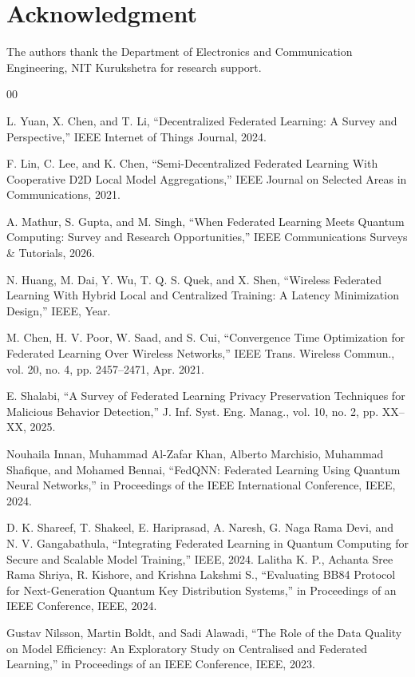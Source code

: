 \documentclass[conference]{IEEEtran}
\begin{document}
\section*{Acknowledgment}

The authors thank the Department of Electronics and Communication Engineering, NIT Kurukshetra for research support.

\begin{thebibliography}{00}

L. Yuan, X. Chen, and T. Li, “Decentralized Federated Learning: A Survey and Perspective,” IEEE Internet of Things Journal, 2024.

F. Lin, C. Lee, and K. Chen, “Semi-Decentralized Federated Learning With Cooperative D2D Local Model Aggregations,” IEEE Journal on Selected Areas in Communications, 2021.

A. Mathur, S. Gupta, and M. Singh, “When Federated Learning Meets Quantum Computing: Survey and Research Opportunities,” IEEE Communications Surveys \& Tutorials, 2026.

 N. Huang, M. Dai, Y. Wu, T. Q. S. Quek, and X. Shen, 
“Wireless Federated Learning With Hybrid Local and Centralized Training: A Latency Minimization Design,” 
IEEE, Year.

 M. Chen, H. V. Poor, W. Saad, and S. Cui, 
“Convergence Time Optimization for Federated Learning Over Wireless Networks,” 
IEEE Trans. Wireless Commun., vol. 20, no. 4, pp. 2457–2471, Apr. 2021.

 E. Shalabi, 
“A Survey of Federated Learning Privacy Preservation Techniques for Malicious Behavior Detection,” 
J. Inf. Syst. Eng. Manag., vol. 10, no. 2, pp. XX–XX, 2025.

Nouhaila Innan, Muhammad Al-Zafar Khan, Alberto Marchisio, Muhammad 
Shafique, and Mohamed Bennai, “FedQNN: Federated Learning Using 
Quantum Neural Networks,” in Proceedings of the IEEE International 
Conference, IEEE, 2024.

D. K. Shareef, T. Shakeel, E. Hariprasad, A. Naresh, 
G. Naga Rama Devi, and N. V. Gangabathula, 
“Integrating Federated Learning in Quantum Computing for 
Secure and Scalable Model Training,” IEEE, 2024.
Lalitha K. P., Achanta Sree Rama Shriya, R. Kishore, and Krishna Lakshmi S., “Evaluating BB84 Protocol for Next-Generation Quantum Key Distribution Systems,” in Proceedings of an IEEE Conference, IEEE, 2024.

Gustav Nilsson, Martin Boldt, and Sadi Alawadi, “The Role of the Data Quality on Model Efficiency: An Exploratory Study on Centralised and Federated Learning,” in Proceedings of an IEEE Conference, IEEE, 2023.

\end{thebibliography}
\end{document}
